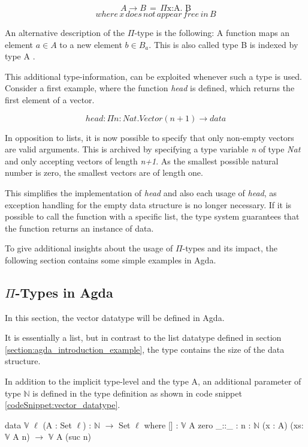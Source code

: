 $$A \rightarrow B \, = \, \Pi \text{x:A. B}$$
$$where \, x \, does \, not \, appear \, free \, in \, B$$

An alternative description of the $\Pi$-type is the following: A function maps an element $a \in A$ to a new element $b \in B_a$. 
This is also called type B is indexed by type A \cite{10.1145/2841316}.

This additional type-information, can be exploited whenever such a type is used. 
Consider a first example, where the function \emph{head} is defined, which returns the first element of a vector.

$$head : \Pi n : Nat.Vector(n+1) \rightarrow data$$

In opposition to lists, it is now possible to specify that only non-empty vectors are valid arguments. 
This is archived by specifying a type variable \emph{n} of type \emph{Nat} and only accepting vectors of length \emph{n+1}.
As the smallest possible natural number is zero, the smallest vectors are of length one.

This simplifies the implementation of \emph{head} and also each usage of \emph{head}, as exception handling for the empty data structure is no longer necessary. 
If it is possible to call the function with a specific list, the type system guarantees that the function returns an instance of data.

To give additional insights about the usage of $\Pi$-types and its impact, the following section contains some simple examples in Agda.

\subsection{$\Pi$-Types in Agda}\label{section_dependent_types_example}
In this section, the vector datatype will be defined in Agda.

It is essentially a list, but in contrast to the list datatype defined in section \ref{section:agda_introduction_example}, the type contains the size of the data structure.

In addition to the implicit type-level and the type A, an additional parameter of type $\mathbb{N}$ is defined in the type definition as shown in code snippet \ref{codeSnippet:vector_datatype}.

\begin{codesnippet}[mathescape=true, caption={Definition of the vector datatype in Agda}, label={codeSnippet:vector_datatype}]
data $\mathbb{V}$ {$\ell$} (A : Set $\ell$) : $\mathbb{N}$ $\rightarrow$ Set $\ell$ where
  [] : $\mathbb{V}$ A zero
  _::_ : {n : $\mathbb{N}$} (x : A) (xs: $\mathbb{V}$ A n) $\rightarrow$
         $\mathbb{V}$ A (suc n)
\end{codesnippet}

